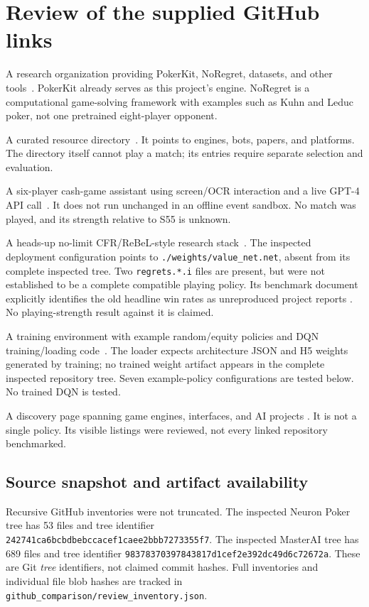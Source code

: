 \documentclass[11pt,letterpaper]{article}
\begin{document}
\section{Review of the supplied GitHub links}
\begin{description}[style=nextline]
\item[\texttt{uoftcprg}]
A research organization providing PokerKit, NoRegret, datasets, and other
tools~\cite{uoftcprg,noregret}. PokerKit already serves as this project's
engine. NoRegret is a computational game-solving framework with examples
such as Kuhn and Leduc poker, not one pretrained eight-player opponent.
\item[\texttt{apehex/awesome-poker}]
A curated resource directory~\cite{awesome}. It points to engines, bots,
papers, and platforms. The directory itself cannot play a match; its
entries require separate selection and evaluation.
\item[\texttt{HarperJonesGPT/PokerGPT}]
A six-player cash-game assistant using screen/OCR interaction and a live
GPT-4 API call~\cite{pokergpt}. It does not run unchanged in an offline event
sandbox. No match was played, and its strength relative to S55 is unknown.
\item[\texttt{masterai-top/cfr-poker-ai-masterai}]
A heads-up no-limit CFR/ReBeL-style research stack~\cite{masterai}.
The inspected deployment configuration points to
\texttt{./weights/value\_net.net}, absent from its complete inspected tree.
Two \texttt{regrets.*.i} files are present, but were not established to be a
complete compatible playing policy. Its benchmark document explicitly
identifies the old headline win rates as unreproduced project reports
\cite{masteraibench}. No playing-strength result against it is claimed.
\item[\texttt{dickreuter/neuron\_poker}]
A training environment with example random/equity policies and DQN
training/loading code~\cite{neuron}. The loader expects architecture JSON
and H5 weights generated by training; no trained weight artifact appears
in the complete inspected repository tree. Seven example-policy
configurations are tested below. No trained DQN is tested.
\item[\texttt{github.com/topics/poker-game}]
A discovery page spanning game engines, interfaces, and AI projects
\cite{topic}. It is not a single policy. Its visible listings were reviewed,
not every linked repository benchmarked.
\end{description}

\subsection{Source snapshot and artifact availability}
Recursive GitHub inventories were not truncated. The inspected Neuron Poker
tree has 53 files and tree identifier
\texttt{242741ca6bcbdbebccacef1caee2bbb7273355f7}. The inspected MasterAI tree
has 689 files and tree identifier
\texttt{98378370397843817d1cef2e392dc49d6c72672a}. These are Git
\emph{tree} identifiers, not claimed commit hashes. Full inventories and
individual file blob hashes are tracked in
\texttt{github\_comparison/review\_inventory.json}.
\end{document}
